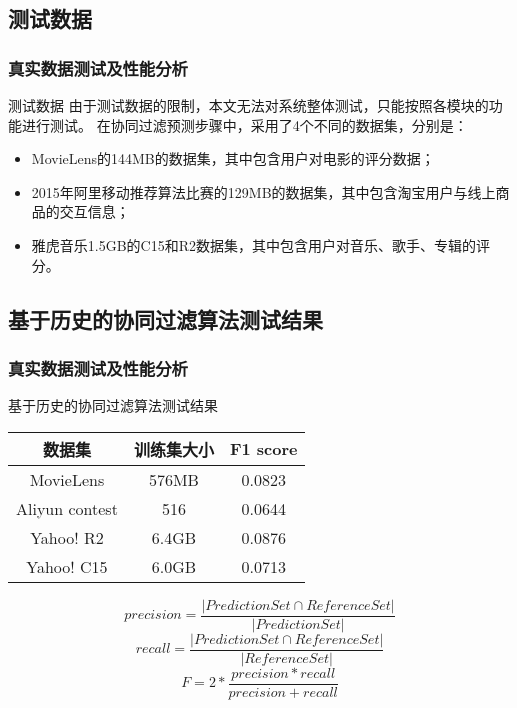\documentclass{beamer}
\begin{document}
\subsection{测试数据}
\begin{frame}
	\frametitle{真实数据测试及性能分析}
		\begin{block}{测试数据}
		由于测试数据的限制，本文无法对系统整体测试，只能按照各模块的功能进行测试。
		在协同过滤预测步骤中，采用了4个不同的数据集，分别是：
		\begin{itemize}
		\item MovieLens的144MB的数据集，其中包含用户对电影的评分数据；
		\item 2015年阿里移动推荐算法比赛的129MB的数据集，其中包含淘宝用户与线上商品的交互信息；
		\item 雅虎音乐1.5GB的C15和R2数据集，其中包含用户对音乐、歌手、专辑的评分。
	\end{itemize}
	\end{block}
\end{frame}

\subsection{基于历史的协同过滤算法测试结果}
\begin{frame}[shrink]
	\frametitle{真实数据测试及性能分析}
		\begin{block}{基于历史的协同过滤算法测试结果}
		\begin{center}
\begin{tabular}{c|c|c}
 \hline
数据集 & 训练集大小 & F1 score \\ \hline
MovieLens & 576MB & 0.0823 \\ \hline
Aliyun contest & 516 & 0.0644 \\ \hline
Yahoo! R2 & 6.4GB & 0.0876 \\ \hline
Yahoo! C15 & 6.0GB & 0.0713 \\ \hline
\end{tabular}
\end{center}
\begin{equation*}
precision= \frac{|PredictionSet\cap ReferenceSet|}{|PredictionSet|}
\end{equation*}
\begin{equation*}
recall= \frac{|PredictionSet\cap ReferenceSet|}{|ReferenceSet|}
\end{equation*}
\begin{equation*}
F= 2* \frac{precision*recall}{precision+recall}
\end{equation*}
	\end{block}
\end{frame}
\end{document}
